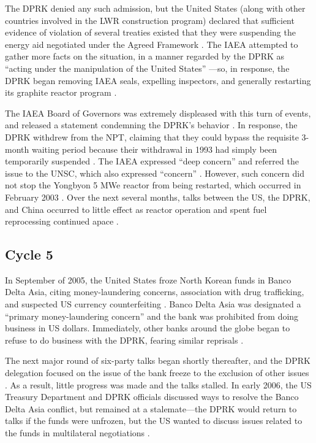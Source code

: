 The DPRK denied any such admission, but the United States (along with other countries involved in the LWR construction program) declared that sufficient evidence of violation of several treaties existed that they were suspending the energy aid negotiated under the Agreed Framework \cite{iaea09}. The IAEA attempted to gather more facts on the situation, in a manner regarded by the DPRK as ``acting under the manipulation of the United States'' \cite{hurriyet}---so, in response, the DPRK began removing IAEA seals, expelling inspectors, and generally restarting its graphite reactor program \cite{iaea09}.

The IAEA Board of Governors was extremely displeased with this turn of events, and released a statement condemning the DPRK's behavior \cite{iaea03}. In response, the DPRK withdrew from the NPT, claiming that they could bypass the requisite 3-month waiting period because their withdrawal in 1993 had simply been temporarily suspended \cite{kcna4}. The IAEA expressed ``deep concern'' and referred the issue to the UNSC, which also expressed ``concern'' \cite{iaea09}. However, such concern did not stop the Yongbyon 5 MWe reactor from being restarted, which occurred in February 2003 \cite{davenport}. Over the next several months, talks between the US, the DPRK, and China occurred to little effect as reactor operation and spent fuel reprocessing continued apace \cite{davenport}.

\subsection{Cycle 5}
In September of 2005, the United States froze North Korean funds in Banco Delta Asia, citing money-laundering concerns, association with drug trafficking, and suspected US currency counterfeiting \cite{davenport}. Banco Delta Asia was designated a ``primary money-laundering concern'' and the bank was prohibited from doing business in US dollars. Immediately, other banks around the globe began to refuse to do business with the DPRK, fearing similar reprisals \cite{greenlees}.

The next major round of six-party talks began shortly thereafter, and the DPRK delegation focused on the issue of the bank freeze to the exclusion of other issues \cite{greenlees}. As a result, little progress was made and the talks stalled. In early 2006, the US Treasury Department and DPRK officials discussed ways to resolve the Banco Delta Asia conflict, but remained at a stalemate---the DPRK would return to talks if the funds were unfrozen, but the US wanted to discuss issues related to the funds in multilateral negotiations \cite{greenlees}.

